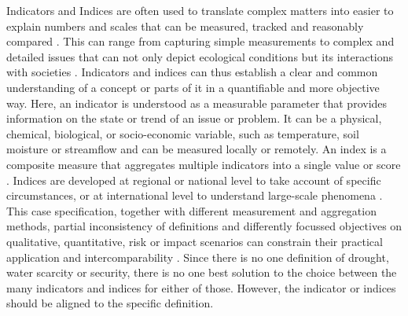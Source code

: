 Indicators and Indices are often used to translate complex matters into easier to explain numbers and scales that can be measured, tracked and reasonably compared \autocite{blauveltSystematizingEnvironmentalIndicators2014,williamsUsingIndicatorsExplain2017}. This can range from capturing simple measurements to complex and detailed issues that can not only depict ecological conditions but its interactions with societies \autocite{blauveltSystematizingEnvironmentalIndicators2014,mishraWaterSecurityChanging2021}. Indicators and indices can thus establish a clear and common understanding of a concept or parts of it in a quantifiable and more objective way.\newline
Here, an indicator is understood as a measurable parameter that provides information on the state or trend of an issue or problem. It can be a physical, chemical, biological, or socio-economic variable, such as temperature, soil moisture or streamflow and can be measured locally or remotely. An index is a composite measure that aggregates multiple indicators into a single value or score \autocite{unitednationsuniversityTooManyIndicators2017,williamsUsingIndicatorsExplain2017, svobodaHandbookDroughtIndicators2016}. Indices are developed at regional or national level to take account of specific circumstances, or at international level to understand large-scale phenomena \autocite{unitednationsuniversityTooManyIndicators2017}. This case specification, together with different measurement and aggregation methods, partial inconsistency of definitions and differently focussed objectives on qualitative, quantitative, risk or impact scenarios can constrain their practical application and intercomparability \autocite{svobodaHandbookDroughtIndicators2016,unitednationsuniversityTooManyIndicators2017}. Since there is no one definition of drought, water scarcity or security, there is no one best solution to the choice between the many indicators and indices for either of those. However, the indicator or indices should be aligned to the specific definition.

